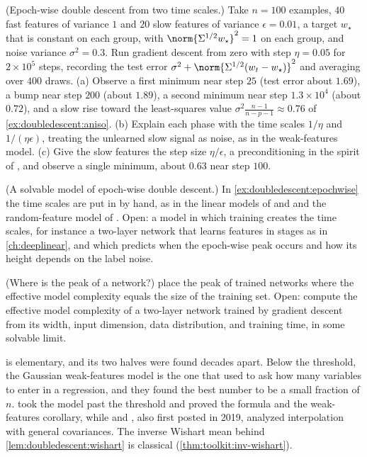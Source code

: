 \begin{refsection}
\begin{exercises}
\item \simulation (Epoch-wise double descent from two time scales.) Take $n=100$ examples, $40$ fast features of variance $1$ and $20$ slow features of variance $\epsilon=0.01$, a target $w_\star$ that is constant on each group, with $\norm{\Sigma^{1/2}w_\star}^2=1$ on each group, and noise variance $\sigma^2=0.3$. Run gradient descent from zero with step $\eta=0.05$ for $2\times10^5$ steps, recording the test error $\sigma^2+\norm{\Sigma^{1/2}(w_t-w_\star)}^2$ and averaging over $400$ draws. (a) Observe a first minimum near step $25$ (test error about $1.69$), a bump near step $200$ (about $1.89$), a second minimum near step $1.3\times10^4$ (about $0.72$), and a slow rise toward the least-squares value $\sigma^2\frac{n-1}{n-p-1}\approx0.76$ of \cref{ex:doubledescent:aniso}. (b) Explain each phase with the time scales $1/\eta$ and $1/(\eta\epsilon)$, treating the unlearned slow signal as noise, as in the weak-features model. (c) Give the slow features the step size $\eta/\epsilon$, a preconditioning in the spirit of \textcite{HeckelYilmaz2021}, and observe a single minimum, about $0.63$ near step $100$.\label{ex:doubledescent:epochwise}

\item \research (A solvable model of epoch-wise double descent.) In \cref{ex:doubledescent:epochwise} the time scales are put in by hand, as in the linear models of \textcite{HeckelYilmaz2021} and \textcite{PezeshkiEtAl2022} and the random-feature model of \textcite{BodinMacris2021}. Open: a model in which training creates the time scales, for instance a two-layer network that learns features in stages as in \cref{ch:deeplinear}, and which predicts when the epoch-wise peak occurs and how its height depends on the label noise.\label{ex:doubledescent:researchepoch}

\item \research (Where is the peak of a network?) \Textcite{NakkiranEtAl2020} place the peak of trained networks where the effective model complexity equals the size of the training set. Open: compute the effective model complexity of a two-layer network trained by gradient descent from its width, input dimension, data distribution, and training time, in some solvable limit.\label{ex:doubledescent:researchpeak}
\end{exercises}

\notesandrefs
{} is elementary, and its two halves were found decades apart. Below the threshold, the Gaussian weak-features model is the one that \textcite{BreimanFreedman1983} used to ask how many variables to enter in a regression, and they found the best number to be a small fraction of $n$. \Textcite{BelkinEtAl2020} took the model past the threshold and proved the formula and the weak-features corollary, while \textcite{HastieEtAl2022} and \textcite{BartlettEtAl2020}, also first posted in 2019, analyzed interpolation with general covariances. The inverse Wishart mean behind \cref{lem:doubledescent:wishart} is classical (\cref{thm:toolkit:inv-wishart}).


\end{refsection}
